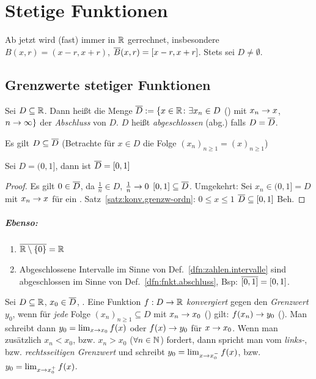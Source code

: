 \documentclass[12pt]{scrreprt}
\begin{document}
\chapter{Stetige Funktionen}
\label{cha:fnkt}
Ab jetzt wird (fast) immer in $\mathbb{R}$ gerrechnet, insbesondere $B(x, r) = (x-r, x+r)$, $\overline{B}(x, r) = [x-r, x+r]$.
Stets sei $D \neq \emptyset$.

\section{Grenzwerte stetiger Funktionen}
\label{sec:fnkt.grenzw-stetigk}
\begin{dfn}\label{dfn:fnkt.abschluss}
Sei $D \subseteq \mathbb{R}$. Dann heißt die Menge $\overline{D} := \{x\in\mathbb{R}\colon \exists x_n\in D$ ()
mit $ x_n \rightarrow x$, $n\rightarrow\infty\}$ der \emph{Abschluss} von $D$. $D$ heißt \emph{abgeschlossen} (abg.) falls $D = \overline{D}$.
\end{dfn}

\begin{bem*}
Es gilt $D \subseteq \overline{D}$ (Betrachte für $x\in D$ die Folge $(x_n)_{n\ge 1} = (x)_{n\ge 1}$)
\end{bem*}

\begin{bsp*}
Sei $D = (0, 1]$, dann ist $\overline{D} = [0, 1]$
\end{bsp*}
\begin{proof}
Es gilt $0\in\overline{D}$, da $\frac{1}{n}\in D$, $\frac{1}{n} \rightarrow 0$  \folgt $[0, 1] \subseteq \overline{D}$. 
Umgekehrt: Sei $x_n \in (0, 1] = D$ mit $x_n \rightarrow x$ für ein . Satz~\ref{satz:konv.grenzw-ordn}: $0\le x\le 1$ \folgt $\overline{D} \subseteq [0,1]$ \folgt Beh.
\end{proof}

\paragraph{Ebenso:}
\begin{enumerate}
\item $\overline{\mathbb{R}\setminus\{0\}} = \mathbb{R}$
\item Abgeschlossene Intervalle im Sinne von Def.~\ref{dfn:zahlen.intervalle} sind abgeschlossen im Sinne 
von Def.~\ref{dfn:fnkt.abschluss}, Bsp: $\overline{[0, 1]} = [0, 1]$.
\end{enumerate}

\begin{dfn}\label{dfn:fnkt.grenzw-fnkt}
Sei $D \subseteq \mathbb{R}$, $x_0 \in \overline{D}$, . Eine Funktion $f: D \rightarrow \mathbb{R}$ \emph{konvergiert}
gegen den \emph{Grenzwert} $y_0$, wenn für \emph{jede} Folge $(x_n)_{n \ge 1} \subseteq D$ mit $x_n \rightarrow x_0$ (\ninf) gilt:
$f(x_n) \rightarrow y_0$ (\ninf). Man schreibt dann $y_0 = \lim_{x\rightarrow x_0} f(x)$ oder $f(x) \rightarrow y_0$ für $x \rightarrow x_0$.
Wenn man zusätzlich $x_n < x_0$, bzw. $x_n > x_0$ ($\forall n\in\mathbb{N}$) fordert, dann spricht man vom \emph{links-}, 
bzw. \emph{rechtsseitigen Grenzwert} und schreibt $y_0 = \lim_{x\rightarrow x_0^-} f(x)$, bzw. $y_0 = \lim_{x\rightarrow x_0^+} f(x)$.
\end{dfn}
\end{document}

